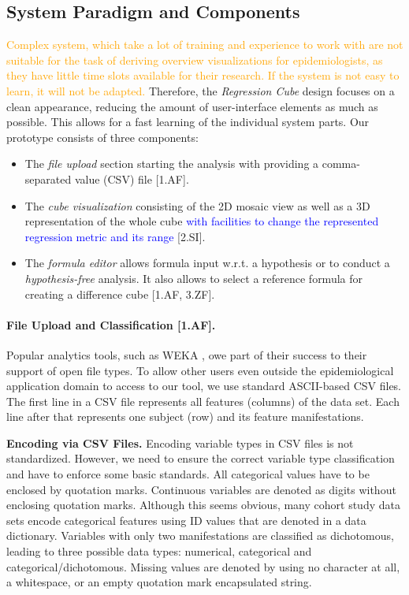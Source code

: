 \documentclass[journal]{style/vgtc} 			          %
\newcommand{\add}[1]{\textcolor{blue}{#1}}
\newcommand{\design}[1]{\textcolor{orange}{#1}}
\begin{document}
\subsection{System Paradigm and Components}
\design{
Complex system, which take a lot of training and experience to work with are not suitable for the task of deriving overview visualizations for epidemiologists, as they have little time slots available for their research.
If the system is not easy to learn, it will not be adapted.
}
Therefore, the \emph{Regression Cube} design focuses on a clean appearance, reducing the amount of user-interface elements as much as possible.
This allows for a fast learning of the individual system parts.
Our prototype consists of three components:
\begin{itemize}
	\item The \emph{file upload} section starting the analysis with providing a comma-separated value (CSV) file [1.AF].
	\item The \emph{cube visualization} consisting of the 2D mosaic view as well as a 3D representation of the whole cube \add{with facilities to change the represented regression metric and its range} [2.SI].
	\item The \emph{formula editor} allows formula input w.r.t. a hypothesis or to conduct a \emph{hypothesis-free} analysis.
	It also allows to select a reference formula for creating a difference cube [1.AF, 3.ZF].
\end{itemize}
\paragraph{File Upload and Classification [1.AF].}
Popular analytics tools, such as WEKA \cite{WEKA}, owe part of their success to their support of open file types.
To allow other users even outside the epidemiological application domain to access to our tool, we use standard ASCII-based CSV files.
The first line in a CSV file represents all features (columns) of the data set.
Each line after that represents one subject (row) and its feature manifestations.

\textbf{Encoding via CSV Files.}
Encoding variable types in CSV files is not standardized.
However, we need to ensure the correct variable type classification and have to enforce some basic standards.
All categorical values have to be enclosed by quotation marks.
Continuous variables are denoted as digits without enclosing quotation marks.
Although this seems obvious, many cohort study data sets encode categorical features using ID values that are denoted in a data dictionary.
Variables with only two manifestations are classified as dichotomous, leading to three possible data types: numerical, categorical and categorical/dichotomous.
Missing values are denoted by using no character at all, a whitespace, or an empty quotation mark encapsulated string.
\end{document}
